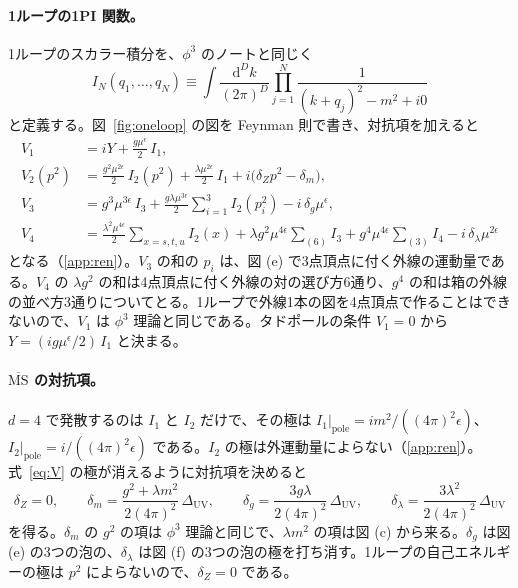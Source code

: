 \documentclass[a4paper,10pt]{ltjsarticle}
\newcommand{\dd}{\mathrm{d}}
\begin{document}
\paragraph{1ループの1PI 関数。}1ループのスカラー積分を、$\phi^3$ のノートと同じく
\begin{equation}
I_N(q_1,\dots,q_N)\equiv\int\frac{\dd^Dk}{(2\pi)^D}\prod_{j=1}^{N}\frac{1}{(k+q_j)^2-m^2+i0}
\label{eq:IN}
\end{equation}
と定義する。図~\ref{fig:oneloop} の図を Feynman 則で書き、対抗項を加えると
\begin{equation}
\begin{aligned}
V_1&=iY+\frac{g\mu^\epsilon}{2}\,I_1,\\
V_2(p^2)&=\frac{g^2\mu^{2\epsilon}}{2}\,I_2(p^2)+\frac{\lambda\mu^{2\epsilon}}{2}\,I_1+i\bigl(\delta_Zp^2-\delta_m\bigr),\\
V_3&=g^3\mu^{3\epsilon}\,I_3+\frac{g\lambda\mu^{3\epsilon}}{2}\sum_{i=1}^{3}I_2(p_i^2)-i\,\delta_g\mu^{\epsilon},\\
V_4&=\frac{\lambda^2\mu^{4\epsilon}}{2}\sum_{x=s,t,u}I_2(x)+\lambda g^2\mu^{4\epsilon}\sum_{(6)}I_3+g^4\mu^{4\epsilon}\sum_{(3)}I_4-i\,\delta_\lambda\mu^{2\epsilon}
\end{aligned}
\label{eq:V}
\end{equation}
となる（\ref{app:ren}）。$V_3$ の和の $p_i$ は、図 (e) で3点頂点に付く外線の運動量である。$V_4$ の $\lambda g^2$ の和は4点頂点に付く外線の対の選び方6通り、$g^4$ の和は箱の外線の並べ方3通りについてとる。1ループで外線1本の図を4点頂点で作ることはできないので、$V_1$ は $\phi^3$ 理論と同じである。タドポールの条件 $V_1=0$ から $Y=(ig\mu^\epsilon/2)\,I_1$ と決まる。

\paragraph{$\overline{\mathrm{MS}}$ の対抗項。}$d=4$ で発散するのは $I_1$ と $I_2$ だけで、その極は $I_1|_{\mathrm{pole}}=im^2/((4\pi)^2\epsilon)$、$I_2|_{\mathrm{pole}}=i/((4\pi)^2\epsilon)$ である。$I_2$ の極は外運動量によらない（\ref{app:ren}）。式~\eqref{eq:V} の極が消えるように対抗項を決めると
\begin{equation}
\delta_Z=0,\qquad
\delta_m=\frac{g^2+\lambda m^2}{2(4\pi)^2}\,\Delta_{\mathrm{UV}},\qquad
\delta_g=\frac{3g\lambda}{2(4\pi)^2}\,\Delta_{\mathrm{UV}},\qquad
\delta_\lambda=\frac{3\lambda^2}{2(4\pi)^2}\,\Delta_{\mathrm{UV}}
\label{eq:ct}
\end{equation}
を得る。$\delta_m$ の $g^2$ の項は $\phi^3$ 理論と同じで、$\lambda m^2$ の項は図 (c) から来る。$\delta_g$ は図 (e) の3つの泡の、$\delta_\lambda$ は図 (f) の3つの泡の極を打ち消す。1ループの自己エネルギーの極は $p^2$ によらないので、$\delta_Z=0$ である。
\end{document}

